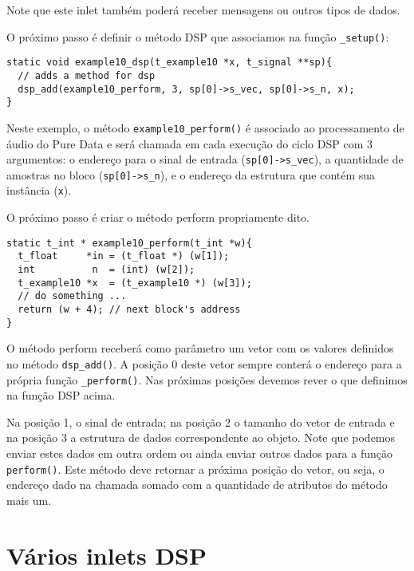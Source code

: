 Note que este inlet também poderá receber mensagens ou outros tipos de dados.

O próximo passo é definir o método DSP que associamos na função
\texttt{\_setup()}:

\begin{lstlisting}[caption=Definição da função DSP]
static void example10_dsp(t_example10 *x, t_signal **sp){
  // adds a method for dsp
  dsp_add(example10_perform, 3, sp[0]->s_vec, sp[0]->s_n, x);
}
\end{lstlisting}

Neste exemplo, o método \texttt{example10\_perform()} é associado ao
processamento de áudio do Pure Data e será chamada em cada execução do ciclo
DSP com 3 argumentos: o endereço para o sinal de entrada
(\texttt{sp[0]->s\_vec}), a quantidade de amostras no bloco
(\texttt{sp[0]->s\_n}), e o endereço da estrutura que contém sua instância
(\texttt{x}).

O próximo passo é criar o método perform propriamente dito.

\begin{lstlisting}[caption=Definição da função DSP]
static t_int * example10_perform(t_int *w){
  t_float     *in = (t_float *) (w[1]);
  int          n  = (int) (w[2]);
  t_example10 *x  = (t_example10 *) (w[3]);
  // do something ...
  return (w + 4); // next block's address
}
\end{lstlisting}

O método perform receberá como parâmetro um vetor com os valores definidos no
método \texttt{dsp\_add()}.
A posição 0 deste vetor sempre conterá o endereço para a própria função
\texttt{\_perform()}.
Nas próximas posições devemos rever o que definimos na função DSP acima.

Na posição 1, o sinal de entrada;
na posição 2 o tamanho do vetor de entrada e na posição 3 a estrutura de dados
correspondente ao objeto.
Note que podemos enviar estes dados em outra ordem ou ainda enviar outros dados
para a função \texttt{perform()}.
Este método deve retornar a próxima posição do vetor, ou seja, o endereço dado 
na chamada somado com a quantidade de atributos do método mais um.

\section{Vários inlets DSP}

